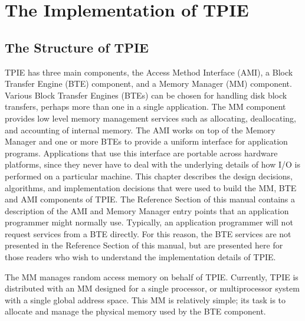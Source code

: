 \chapter{The Implementation of TPIE}


\section{The Structure of TPIE}
  TPIE
has three main components, the Access Method Interface
(AMI), a Block Transfer
Engine (BTE) component, and a
Memory Manager (MM) component.
Various Block Transfer Engines (BTEs) can be chosen for
handling disk block transfers, perhaps more than one in a
single application.  The MM component provides low level
memory management services such as allocating, deallocating,
and accounting of internal memory. The AMI works on top of
the Memory Manager and one or more BTEs to provide a uniform
interface for application programs. Applications that use
this interface are portable across hardware platforms, since
they never have to deal with the underlying details of how
I/O is performed on a particular machine. This chapter
describes the design decisions, algorithms, and
implementation decisions that were used to build the MM, BTE
and AMI components of TPIE. The Reference Section of this
manual contains a description of the AMI and Memory Manager
entry points that an application programmer might normally
use. Typically, an application programmer will not request
services from a BTE directly. For this reason, the BTE
services are not presented in the Reference Section of this
manual, but are presented here for those readers who wish to
understand the implementation details of TPIE.



The MM manages random access memory on behalf of
TPIE.
Currently, TPIE is distributed with an MM designed for a single processor, or
multiprocessor system with a single global address space. This MM is
relatively simple; its task is to allocate and manage the physical memory
used by the BTE component. 

